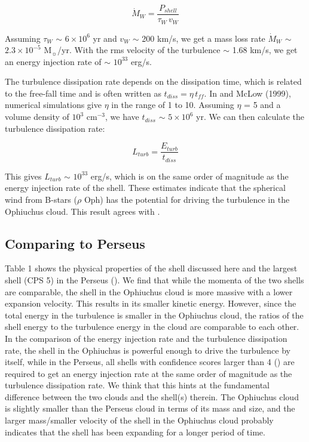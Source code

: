 \documentclass[11pt,a4paper]{emulateapj}
\begin{document}
\begin{equation}
\dot M_W = \frac{P_{shell}}{\tau_W\,v_W}
\end{equation}

Assuming $\tau_W$ $\sim$ $6\times10^6$ yr and $v_W$ $\sim$ 200 km/s, we get a mass loss rate $\dot M_W$ $\sim$ $2.3\times10^{-5}$ M$_{\sun}$/yr. With the rms velocity of the turbulence $\sim$ 1.68 km/s, we get an energy injection rate of $\sim$ $10^{33}$ erg/s.

The turbulence dissipation rate depends on the dissipation time, which is related to the free-fall time and is often written as $t_{diss} = \eta\,t_{ff}$. In \citet{McKee_1989} and McLow (1999), numerical simulations give $\eta$ in the range of 1 to 10. Assuming $\eta$ = 5 and a volume density of $10^3$ cm$^{-3}$, we have $t_{diss}$ $\sim$ $5\times10^6$ yr. We can then calculate the turbulence dissipation rate:

\begin{equation}
L_{turb} = \frac{E_{turb}}{t_{diss}}
\end{equation}

This gives $L_{turb}$ $\sim$ $10^{33}$ erg/s, which is on the same order of magnitude as the energy injection rate of the shell. These estimates indicate that the spherical wind from B-stars ($\rho$ Oph) has the potential for driving the turbulence in the Ophiuchus cloud. This result agrees with \citet{Arce_2011}.

\subsection{Comparing to Perseus}
Table 1 shows the physical properties of the shell discussed here and the largest shell (CPS 5) in the Perseus (\citet{Arce_2011}). We find that while the momenta of the two shells are comparable, the shell in the Ophiuchus cloud is more massive with a lower expansion velocity. This results in its smaller kinetic energy. However, since the total energy in the turbulence is smaller in the Ophiuchus cloud, the ratios of the shell energy to the turbulence energy in the cloud are comparable to each other. In the comparison of the energy injection rate and the turbulence dissipation rate, the shell in the Ophiuchus is powerful enough to drive the turbulence by itself, while in the Perseus, all shells with confidence scores larger than 4 (\citet{Arce_2011}) are required to get an energy injection rate at the same order of magnitude as the turbulence dissipation rate. We think that this hints at the fundamental difference between the two clouds and the shell(s) therein. The Ophiuchus cloud is slightly smaller than the Perseus cloud in terms of its mass and size, and the larger mass/smaller velocity of the shell in the Ophiuchus cloud probably indicates that the shell has been expanding for a longer period of time.
\end{document}
